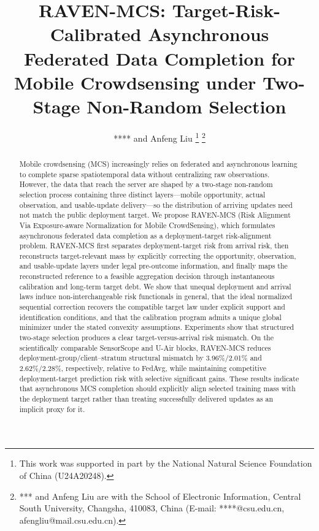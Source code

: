 \documentclass[letterpaper,journal]{IEEEtran}
\begin{document}
\title{RAVEN-MCS: Target-Risk-Calibrated Asynchronous Federated Data Completion for Mobile Crowdsensing under Two-Stage Non-Random Selection}

\author{**** and Anfeng Liu%
\thanks{This work was supported in part by the National Natural Science Foundation of China (U24A20248).}%
\thanks{*** and Anfeng Liu are with the School of Electronic Information, Central South University, Changsha, 410083, China (E-mail: ****@csu.edu.cn, afengliu@mail.csu.edu.cn).}%
}


\maketitle





\begin{abstract}
Mobile crowdsensing (MCS) increasingly relies on federated and asynchronous learning to complete sparse spatiotemporal data without centralizing raw observations. However, the data that reach the server are shaped by a two-stage non-random selection process containing three distinct layers---mobile opportunity, actual observation, and usable-update delivery---so the distribution of arriving updates need not match the public deployment target. We propose RAVEN-MCS (Risk Alignment Via Exposure-aware Normalization for Mobile CrowdSensing), which formulates asynchronous federated data completion as a deployment-target risk-alignment problem. RAVEN-MCS first separates deployment-target risk from arrival risk, then reconstructs target-relevant mass by explicitly correcting the opportunity, observation, and usable-update layers under legal pre-outcome information, and finally maps the reconstructed reference to a feasible aggregation decision through instantaneous calibration and long-term target debt. We show that unequal deployment and arrival laws induce non-interchangeable risk functionals in general, that the ideal normalized sequential correction recovers the compatible target law under explicit support and identification conditions, and that the calibration program admits a unique global minimizer under the stated convexity assumptions. Experiments show that structured two-stage selection produces a clear target-versus-arrival risk mismatch. On the scientifically comparable SensorScope and U-Air blocks, RAVEN-MCS reduces deployment-group/client--stratum structural mismatch by 3.96\%/2.01\% and 2.62\%/2.28\%, respectively, relative to FedAvg, while maintaining competitive deployment-target prediction risk with selective significant gains. These results indicate that asynchronous MCS completion should explicitly align selected training mass with the deployment target rather than treating successfully delivered updates as an implicit proxy for it.
\end{abstract}
\end{document}
